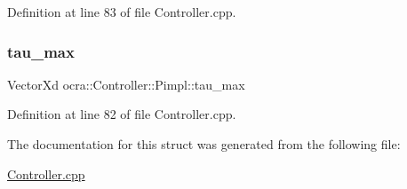 Definition at line 83 of file Controller.\+cpp.

\hypertarget{structocra_1_1Controller_1_1Pimpl_a19486bfe59a11231eeabfd3b2b9abd39}{}\label{structocra_1_1Controller_1_1Pimpl_a19486bfe59a11231eeabfd3b2b9abd39} 
\subsubsection{\texorpdfstring{tau\+\_\+max}{tau\_max}}
{\footnotesize\ttfamily Vector\+Xd ocra\+::\+Controller\+::\+Pimpl\+::tau\+\_\+max}



Definition at line 82 of file Controller.\+cpp.



The documentation for this struct was generated from the following file\+:\begin{DoxyCompactItemize}
\item 
\hyperlink{Controller_8cpp}{Controller.\+cpp}\end{DoxyCompactItemize}
